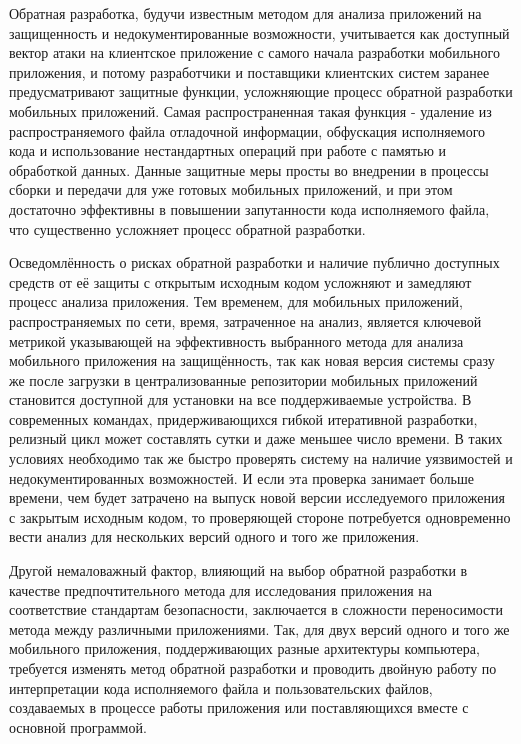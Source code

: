 Обратная разработка, будучи известным методом для анализа приложений на защищенность и недокументированные возможности, учитывается как доступный вектор атаки на клиентское приложение с самого начала разработки мобильного приложения, и потому разработчики и поставщики клиентских систем заранее предусматривают защитные функции, усложняющие процесс обратной разработки мобильных приложений. Самая распространенная такая функция - удаление из распространяемого файла отладочной информации, обфускация исполняемого кода и использование нестандартных операций при работе с памятью и обработкой данных. Данные защитные меры просты во внедрении в процессы сборки и передачи для уже готовых мобильных приложений, и при этом достаточно эффективны в повышении запутанности кода исполняемого файла, что существенно усложняет процесс обратной разработки.

Осведомлённость о рисках обратной разработки и наличие публично доступных средств от её защиты с открытым исходным кодом усложняют и замедляют процесс анализа приложения. Тем временем, для мобильных приложений, распространяемых по сети, время, затраченное на анализ, является ключевой метрикой указывающей на эффективность выбранного метода для анализа мобильного приложения на защищённость, так как новая версия системы сразу же после загрузки в централизованные репозитории мобильных приложений становится доступной для установки на все поддерживаемые устройства. В современных командах, придерживающихся гибкой итеративной разработки, релизный цикл может составлять сутки и даже меньшее число времени. В таких условиях необходимо так же быстро проверять систему на наличие уязвимостей и недокументированных возможностей. И если эта проверка занимает больше времени, чем будет затрачено на выпуск новой версии исследуемого приложения с закрытым исходным кодом, то проверяющей стороне потребуется одновременно вести анализ для нескольких версий одного и того же приложения.

Другой немаловажный фактор, влияющий на выбор обратной разработки в качестве предпочтительного метода для исследования приложения на соответствие стандартам безопасности, заключается в сложности переносимости метода между различными приложениями. Так, для двух версий одного и того же мобильного приложения, поддерживающих разные архитектуры компьютера, требуется изменять метод обратной разработки и проводить двойную работу по интерпретации кода исполняемого файла и пользовательских файлов, создаваемых в процессе работы приложения или поставляющихся вместе с основной программой.

